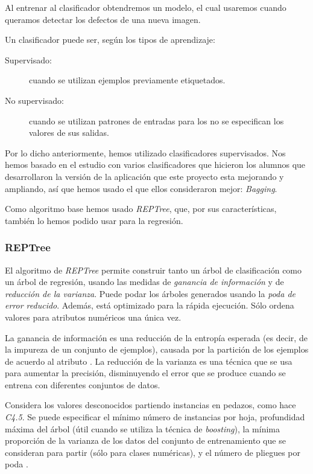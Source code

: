 Al entrenar al clasificador obtendremos un modelo, el cual usaremos cuando queramos detectar los defectos de una nueva imagen.

Un clasificador puede ser, según los tipos de aprendizaje:

\begin{description}
\item[Supervisado:] cuando se utilizan ejemplos previamente etiquetados.
\item[No supervisado:] cuando se utilizan patrones de entradas para los no se especifican los valores
de sus salidas.
\end{description}

Por lo dicho anteriormente, hemos utilizado clasificadores supervisados. Nos hemos basado en el estudio con varios clasificadores que hicieron los alumnos que desarrollaron la versión de la aplicación que este proyecto esta mejorando y ampliando, así que hemos usado el que ellos consideraron mejor: \textit{Bagging}.

Como algoritmo base hemos usado \textit{REPTree}, que, por sus características, también lo hemos podido usar para la regresión.

\subsubsection{REPTree}
El algoritmo de \textit{REPTree} \cite{ian_h._witten_data_2005} permite construir tanto un árbol de clasificación como un árbol de regresión, usando las medidas de \textit{ganancia de información} y de \textit{reducción de la varianza}. Puede podar los árboles generados usando la \textit{poda de error reducido}. Además, está optimizado para la rápida ejecución. Sólo ordena valores para atributos numéricos una única vez.

La ganancia de información es una reducción de la entropía esperada (es decir, de la impureza de un conjunto de ejemplos), causada por la partición de los ejemplos de acuerdo al atributo \cite{juan_jose_rodriguez_diez_apuntes_2012}. La reducción de la varianza es una técnica que se usa para aumentar la precisión, disminuyendo el error que se produce cuando se entrena con diferentes conjuntos de datos.

Considera los valores desconocidos partiendo instancias en pedazos, como hace \textit{C4.5}. Se puede especificar el mínimo número de instancias por hoja, profundidad máxima del árbol (útil cuando se utiliza la técnica de \textit{boosting}), la mínima proporción de la varianza de los datos del conjunto de entrenamiento que se consideran para partir (sólo para clases numéricas), y el número de pliegues por poda \cite{ian_h._witten_data_2005}.

